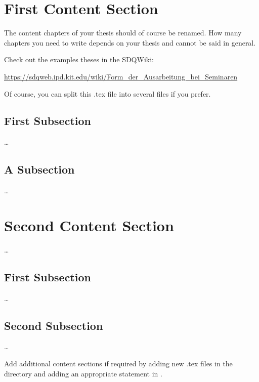 
\section{First Content Section}
\label{ch:FirstContentSection}

The content chapters of your thesis should of course be renamed. How many
chapters you need to write depends on your thesis and cannot be said in general.

Check out the examples theses in the SDQWiki:

\url{https://sdqweb.ipd.kit.edu/wiki/Form_der_Ausarbeitung_bei_Seminaren}

Of course, you can split this .tex file into several files if you prefer. 


\subsection{First Subsection}
\label{sec:FirstContentSection:FirstSubSection}

\dots

\subsection{A Subsection}
\label{sec:FirstContentSection:FirstSubSubSection}

\dots


\section{Second Content Section}
\label{ch:SecondContentSection}

\dots

\subsection{First Subsection}
\label{sec:SecondContentSection:FirstSubsection}

\dots

\subsection{Second Subsection}
\label{sec:SecondContentSection:SecondSubsection}

\dots

Add additional content sections if required by adding new .tex files in the
 directory and adding an appropriate 
 statement in . 
